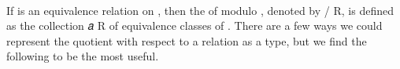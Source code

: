 \begin{code}%
\>[1]\AgdaSpace{}%
\AgdaSymbol{:}\AgdaSpace{}%
\AgdaSymbol{\{}\AgdaSpace{}%
\AgdaSymbol{:}\AgdaSpace{}%
\AgdaSpace{}%
\AgdaSpace{}%
\AgdaSymbol{\}}\AgdaSpace{}%
\AgdaSpace{}%
\AgdaSpace{}%
\AgdaSpace{}%
\AgdaSpace{}%
\AgdaSpace{}%
\AgdaSymbol{(}\AgdaSpace{}%
\AgdaSpace{}%
\AgdaSpace{}%
\AgdaSymbol{)}\AgdaSpace{}%
\<%
\\
%
\>[1]%
\>[4]\AgdaSymbol{\{}\AgdaSymbol{\}}\AgdaSpace{}%
\AgdaSpace{}%
\AgdaSymbol{=}\AgdaSpace{}%
\AgdaSpace{}%
\AgdaSpace{}%
\AgdaSpace{}%
\AgdaSpace{}%
\AgdaFunction{,}\AgdaSpace{}%
\AgdaSpace{}%
\AgdaSpace{}%
\AgdaSymbol{(}\AgdaSpace{}%
\AgdaOperator{\AgdaFunction{[}}\AgdaSpace{}%
\AgdaSpace{}%
\AgdaOperator{\AgdaFunction{]}}\AgdaSpace{}%
\AgdaSymbol{)}\<%
\end{code}
\ccpad
If  is an equivalence relation on , then the  of  modulo , denoted by
 \aof / \ab R, is defined as the collection \as{\{}\af{[} \ab 𝑎 \af{]} \ab R   \as{\}} of equivalence classes of . There are a few ways we could represent the quotient with respect to a relation as a type, but we find the following to be the most useful.
\ccpad
\begin{code}%
\>[1]\AgdaOperator{\AgdaFunction{\AgdaUnderscore{}/\AgdaUnderscore{}}}\AgdaSpace{}%
\AgdaSymbol{:}\AgdaSpace{}%
\AgdaSymbol{(}\AgdaSpace{}%
\AgdaSymbol{:}\AgdaSpace{}%
\AgdaSpace{}%
\AgdaSpace{}%
\AgdaSymbol{)}\AgdaSpace{}%
\AgdaSpace{}%
\AgdaSpace{}%
\AgdaSpace{}%
\AgdaSpace{}%
\AgdaSpace{}%
\AgdaSpace{}%
\AgdaSpace{}%
\AgdaSymbol{(}\AgdaSpace{}%
\AgdaSymbol{)}\AgdaSpace{}%
\<%
\\
%
\>[1]\AgdaSpace{}%
\AgdaOperator{\AgdaFunction{/}}\AgdaSpace{}%
\AgdaSpace{}%
\AgdaSymbol{=}\AgdaSpace{}%
\AgdaSpace{}%
\AgdaSpace{}%
\AgdaSpace{}%
\AgdaSpace{}%
\AgdaSpace{}%
\AgdaSpace{}%
\AgdaFunction{,}%
\>[27]\AgdaSpace{}%
\AgdaSymbol{\{}\AgdaSpace{}%
\AgdaSymbol{=}\AgdaSpace{}%
\AgdaSymbol{\}}\AgdaSpace{}%
\<%
\end{code}
